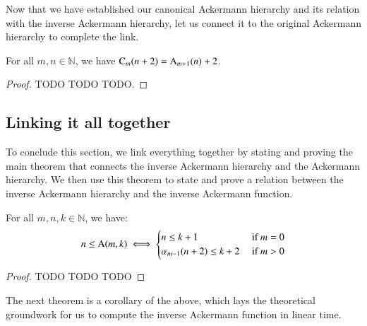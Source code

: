 Now that we have established our canonical Ackermann hierarchy 
and its relation with the inverse Ackermann hierarchy, let us 
connect it to the original Ackermann hierarchy to complete the link.

\begin{thm} \label{thm: can_ack_ack}
For all $m, n\in \mathbb{N}$, we have $\text{C}_m(n+2) = \text{A}_{m+1}(n) + 2$.
\end{thm}

\begin{proof} TODO TODO TODO.
%
%
\end{proof}

\subsection{Linking it all together}

To conclude this section, we link everything together by 
stating and proving the main theorem that connects the 
inverse Ackermann hierarchy and the Ackermann hierarchy. 
We then use this theorem to state and prove a relation 
between the inverse Ackermann hierarchy and the inverse 
Ackermann function.

\begin{thm}  \label{thm: inv_ack_ack}
For all $m, n, k \in \mathbb{N}$, we have:
\begin{equation}
n \le \text{A}(m, k) \iff \begin{cases}
n \le k + 1 & \text{ if } m = 0 \\ \alpha_{m-1}(n+2) \le k + 2 & \text{ if } m > 0
\end{cases}
\end{equation}
\end{thm}


\begin{proof}
TODO TODO TODO
\end{proof}

The next theorem is a corollary of the above, which lays the 
theoretical groundwork for us to compute the inverse Ackermann 
function in linear time.

